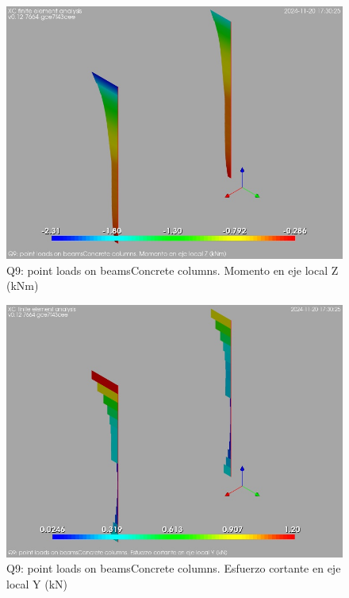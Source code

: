 \begin{figure}[ht]
\begin{center}
\includegraphics[width=\linewidth]{results/graphics/resSimplLC/QpntBeamscolumnZconcrMz.png}
\caption{Q9: point loads on beamsConcrete columns. Momento en eje local Z (kNm)}
\label{QpntBeamscolumnZconcrMz}
\end{center}
\end{figure}
\begin{figure}[ht]
\begin{center}
\includegraphics[width=\linewidth]{results/graphics/resSimplLC/QpntBeamscolumnZconcrVy.png}
\caption{Q9: point loads on beamsConcrete columns. Esfuerzo cortante en eje local Y (kN)}
\label{QpntBeamscolumnZconcrVy}
\end{center}
\end{figure}
